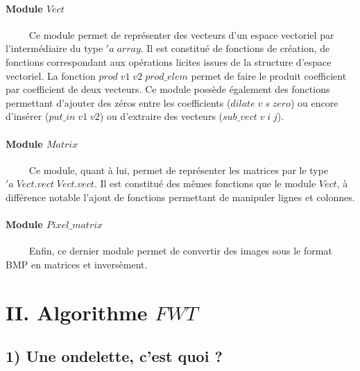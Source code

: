 \documentclass[a4paper,10pt]{report}
\theoremstyle{break}
\begin{document}
    \paragraph{Module $Vect$ \newline}
	$\phantom{Prop}$ Ce module permet de repr\'{e}senter des vecteurs d'un espace vectoriel par l'interm\'{e}diaire du type $'a \; array$.
	Il est constitu\'{e} de fonctions de cr\'{e}ation, de fonctions correspondant aux op\'{e}rations licites issues de la structure d'espace vectoriel.
	La fonction $prod \; v1 \; v2 \; prod\_elem$ permet de faire le produit coefficient par coefficient de deux vecteurs. Ce module
	poss\`{e}de \'{e}galement des fonctions permettant d'ajouter des z\'{e}ros entre les coefficients
	($ dilate \; v \; s \; zero $) ou encore d'ins\'{e}rer ($ put\_in \; v1 \; v2$) ou d'extraire des vecteurs ($sub\_vect \; v \; i \; j$).

    \paragraph{Module $ Matrix $ \newline}
	$\phantom{Prop}$ Ce module, quant \`{a} lui, permet de repr\'{e}senter les matrices par le type $ 'a \; Vect.vect \; Vect.vect $.
	Il est constitu\'{e} des m\^{e}mes fonctions que le module $ Vect $, \`{a} diff\'{e}rence notable l'ajout de fonctions
	permettant de manipuler lignes et colonnes.
	
    \paragraph{Module $ Pixel\_matrix $ \newline}
	$\phantom{Prop}$ Enfin, ce dernier module permet de convertir des images sous le format BMP en matrices et invers\`{e}ment.

\section*{II. Algorithme $ FWT $}

  \subsection*{1) Une ondelette, c'est quoi ?}
    
\end{document}
